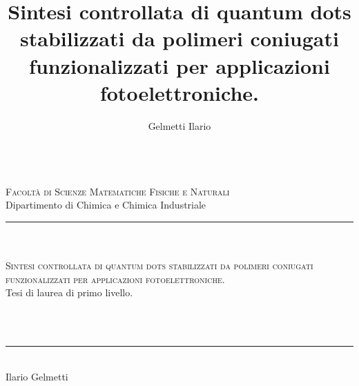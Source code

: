 \documentclass[a4paper, italian, oneside
, 12pt
]{book}
\title{Sintesi controllata di quantum dots stabilizzati da polimeri coniugati funzionalizzati per applicazioni fotoelettroniche.}
\author{Gelmetti Ilario}
\date{}%
\begin{document}
\frontmatter

\begin{titlepage}

\begingroup	%
  \renewcommand{\thepage}{title}%


\begin{center}
	\\%
   	\large{\textsc{Facoltà di Scienze Matematiche Fisiche e Naturali}}\\
   	\large{{Dipartimento di Chimica e Chimica Industriale}}\\
		\rule{5cm}{1pt}\\
			\makebox[\textwidth]{\rule{0pt}{.22\textheight}}\\
	\LARGE{\textsc{Sintesi controllata di quantum dots stabilizzati da polimeri coniugati funzionalizzati per applicazioni fotoelettroniche.}}\\
	\bigskip
	\large{Tesi di laurea di primo livello.}\\	
		\makebox[.2\textwidth]{\rule{0pt}{.1\textheight}}\\
\end{center}

\vfill
\begin{small}
\makebox[\textwidth]{\rule{0pt}{.02\textheight}}\\
	\begin{center}
	\rule{3cm}{1pt}\\
	\LARGE{Ilario Gelmetti}\\		
	\end{center}
\end{small}

  \newpage%
 \endgroup%

\end{titlepage}
\end{document}
